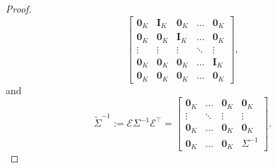 \documentclass[12pt]{amsart}
\numberwithin{equation}{section}
\newcommand{\1}{\mathbf{1}}
\begin{document}
\begin{proof}
\begin{equation*}
\begin{bmatrix}
    \mathbf{0}_{K} & \mathbf{I}_{K} & \mathbf{0}_{K} & \dots & \mathbf{0}_{K}\\
    \mathbf{0}_{K} & \mathbf{0}_{K} & \mathbf{I}_{K}  & \dots & \mathbf{0}_{K}\\
    \vdots & \vdots & \vdots & \ddots & \vdots  \\
    \mathbf{0}_{K} & \mathbf{0}_{K} & \mathbf{0}_{K} & \dots & \mathbf{I}_{K}\\
    \mathbf{0}_{K} & \mathbf{0}_{K} & \mathbf{0}_{K} & \dots & \mathbf{0}_{K}
\end{bmatrix},
\end{equation*}
and
\begin{equation*}
    \tilde{\Sigma}^{-1}:=\mathcal{E}\Sigma^{-1}\mathcal{E}^{\top}=\begin{bmatrix}
    \mathbf{0}_{K}  &\dots & \mathbf{0}_{K} & \mathbf{0}_{K}\\
    \vdots & \ddots& \vdots  & \vdots  \\
    \mathbf{0}_{K} & \dots & \mathbf{0}_{K} & \mathbf{0}_{K}\\
    \mathbf{0}_{K} & \dots & \mathbf{0}_{K} & \Sigma^{-1}
\end{bmatrix}.
\end{equation*}


\end{proof}
\end{document}
